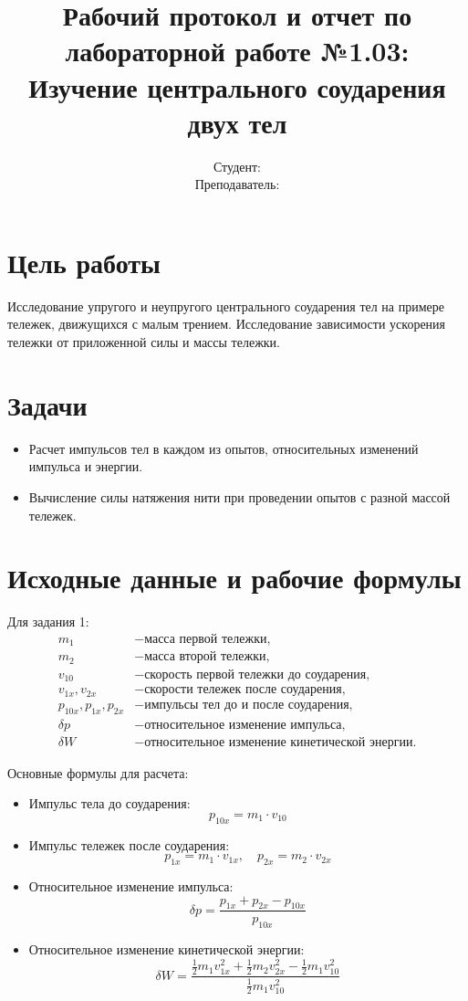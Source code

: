 \documentclass{article}
\title{Рабочий протокол и отчет по лабораторной работе №1.03: \\ Изучение центрального соударения двух тел}
\author{Студент: \\ Преподаватель: }
\date{}
\begin{document}
\maketitle

\section*{Цель работы}
Исследование упругого и неупругого центрального соударения тел на примере тележек, движущихся с малым трением. 
Исследование зависимости ускорения тележки от приложенной силы и массы тележки.

\section*{Задачи}
\begin{itemize}
    \item Расчет импульсов тел в каждом из опытов, относительных изменений импульса и энергии.
    \item Вычисление силы натяжения нити при проведении опытов с разной массой тележек.
\end{itemize}

\section*{Исходные данные и рабочие формулы}
Для задания 1:
\begin{align*}
    m_1 &- \text{масса первой тележки}, \\
    m_2 &- \text{масса второй тележки}, \\
    v_{10} &- \text{скорость первой тележки до соударения}, \\
    v_{1x}, v_{2x} &- \text{скорости тележек после соударения}, \\
    p_{10x}, p_{1x}, p_{2x} &- \text{импульсы тел до и после соударения}, \\
    \delta p &- \text{относительное изменение импульса}, \\
    \delta W &- \text{относительное изменение кинетической энергии}.
\end{align*}

Основные формулы для расчета:

\begin{itemize}
    \item Импульс тела до соударения:
    \[
    p_{10x} = m_1 \cdot v_{10}
    \]
    \item Импульс тележек после соударения:
    \[
    p_{1x} = m_1 \cdot v_{1x}, \quad p_{2x} = m_2 \cdot v_{2x}
    \]
    \item Относительное изменение импульса:
    \[
    \delta p = \frac{p_{1x} + p_{2x} - p_{10x}}{p_{10x}}
    \]
    \item Относительное изменение кинетической энергии:
    \[
    \delta W = \frac{\frac{1}{2} m_1 v_{1x}^2 + \frac{1}{2} m_2 v_{2x}^2 - \frac{1}{2} m_1 v_{10}^2}{\frac{1}{2} m_1 v_{10}^2}
    \]
\end{itemize}
\end{document}
